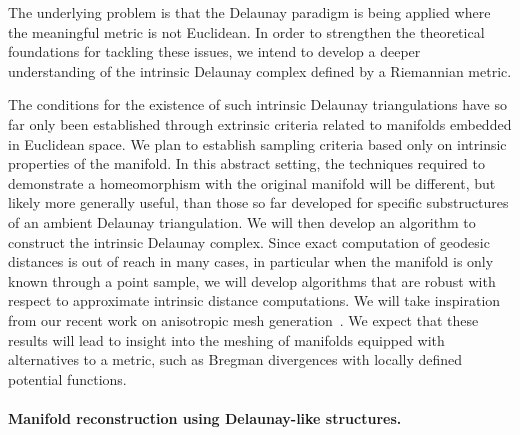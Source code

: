 The underlying problem is that the Delaunay paradigm is being applied
where the meaningful metric is not Euclidean.  In order to strengthen
the theoretical foundations for tackling these issues, we intend to
develop a deeper understanding of the intrinsic Delaunay complex
defined by a Riemannian metric.
%

The conditions for the existence of such intrinsic Delaunay
triangulations have so far only been established through extrinsic
criteria related to manifolds embedded in Euclidean space. We plan to
establish sampling criteria based only on intrinsic properties of the
manifold. In this abstract setting, the techniques required to
demonstrate a homeomorphism with the original manifold will be
different, but likely more generally useful, than those so far
developed for specific substructures of an ambient Delaunay
triangulation.  We will then develop an algorithm to construct the
intrinsic Delaunay complex.  Since exact computation of geodesic
distances is out of reach in many cases, in particular when the
manifold is only known through a point sample, we will develop
algorithms that are robust with respect to approximate intrinsic
distance computations. We will take inspiration from our recent work
on anisotropic mesh generation~\cite{bwy-luam-08}.
We expect that these results will lead to insight into the meshing of
manifolds equipped with alternatives to a metric, such as Bregman
divergences with locally defined potential functions.

\paragraph{Manifold reconstruction using Delaunay-like structures.}


